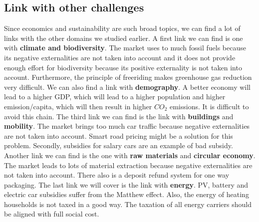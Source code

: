 \documentclass[../summary.tex]{subfiles}
\begin{document}
	  \subsection{Link with other challenges}
	  Since economics and sustainability are such broad topics, we can find a lot of links with the other domains we studied earlier. A first link we can find is one with \textbf{climate and biodiversity}. The market uses to much fossil fuels because its negative externalities are not taken into account and it does not provide enough effort for biodiversity because its positive externality is not taken into account. Furthermore, the principle of freeriding makes greenhouse gas reduction very difficult. We can also find a link with \textbf{demography}. A better economy will lead to a higher GDP, which will lead to a higher population and higher emission/capita, which will then result in higher $CO_2$ emissions. It is difficult to avoid this chain. The third link we can find is the link with \textbf{buildings} and \textbf{mobility}. The market brings too much car traffic because negative externalities are not taken into account. Smart road pricing might be a solution for this problem. Secondly, subsidies for salary cars are an example of bad subsidy. Another link we can find is the one with \textbf{raw materials} and \textbf{circular economy}. The market leads to lots of material extraction because negative externalities are not taken into account. There also is a deposit refund system for one way packaging. The last link we will cover is the link with \textbf{energy}. PV, battery and electric car subsidies suffer from the Matthew effect. Also, the energy of heating households is not taxed in a good way. The taxation of all energy carriers
	  should be aligned with full social cost.
	
\end{document}
